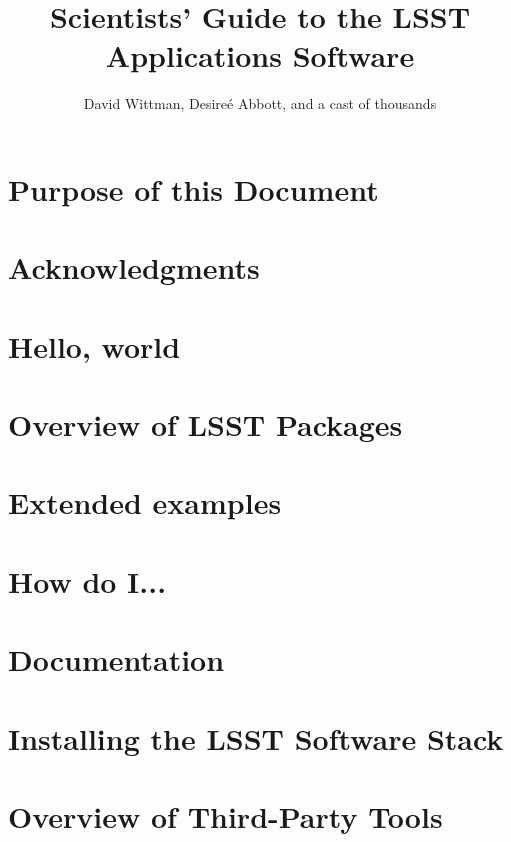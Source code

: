 \documentclass{book}
\title{Scientists' Guide to the LSST Applications Software}
\author{David Wittman, Desire\'{e} Abbott, and a cast of thousands}
\begin{document}
\maketitle


\chapter*{Purpose of this Document\label{chap-purpose}}


\chapter*{Acknowledgments\label{chap-acknowledgements}}



\chapter{Hello, world\label{chap-hello}}


\chapter{Overview of LSST Packages\label{chap-overview}}



\chapter{Extended examples\label{chap-examples}}


\chapter{How do I...\label{chap-howto}}


\chapter{Documentation\label{chap-doc}}


%
% 



\appendix

\chapter{Installing the LSST Software Stack\label{appendix-stackinstall}}


\chapter{Overview of Third-Party Tools\label{appendix-thirdparty}}

\end{document}
